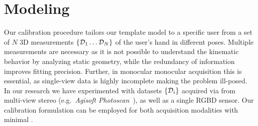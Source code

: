 
\section{Modeling}
\label{sec:modeling}
% 
%
%
%
%

Our calibration procedure tailors our template model to a specific user from a set of $N$ 3D measurements $\{ \mathcal{D}_1 \dots \mathcal{D}_N \}$ of the user's hand in different poses. Multiple measurements are necessary as it is not possible to understand the kinematic behavior by analyzing static geometry, while the redundancy of information improves fitting precision. Further, in monocular monocular acquisition this is essential, as single-view data is highly incomplete making the problem ill-posed. In our research we have experimented with datasets $\{\mathcal{D}_i\}$ acquired via from multi-view stereo (e.g.\ \emph{Agisoft Photoscan~\textcopyright}), as well as a single RGBD sensor. Our calibration formulation can be employed for both acquisition modalities with minimal .


